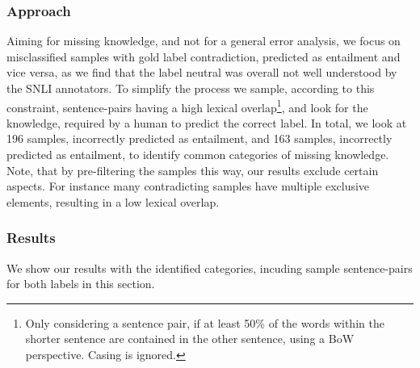 \subsubsection{Approach}
Aiming for missing knowledge, and not for a general error analysis, we focus on misclassified samples with gold label contradiction, predicted as entailment and vice versa, as we find that the label neutral was overall not well understood by the \ac{SNLI} annotators. To simplify the process we sample, according to this constraint, sentence-pairs having a high lexical overlap\footnote{Only considering a sentence pair, if at least 50\% of the words within the shorter sentence are contained in the other sentence, using a \ac{BoW} perspective. Casing is ignored.}, and look for the knowledge, required by a human to predict the correct label. In total, we look at 196 samples, incorrectly predicted as entailment, and 163 samples, incorrectly predicted as entailment, to identify common categories of missing knowledge. Note, that by pre-filtering the samples this way, our results exclude certain aspects. For instance many contradicting samples have multiple exclusive elements, resulting in a low lexical overlap.
\subsubsection{Results}
We show our results with the identified categories, incuding sample sentence-pairs for both labels in this section.

